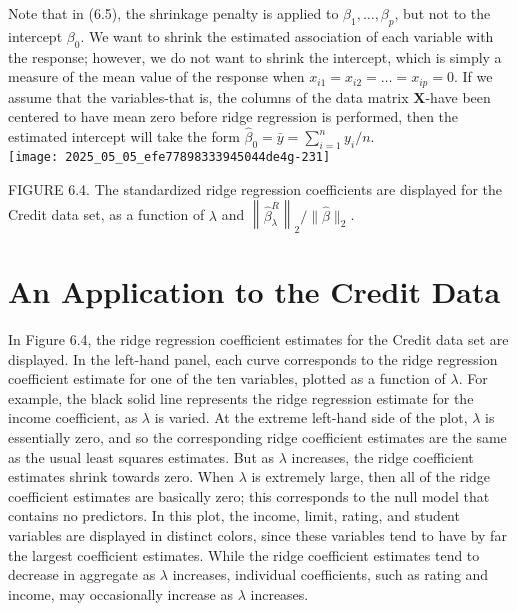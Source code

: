 \documentclass[10pt]{article}
\begin{document}

Note that in (6.5), the shrinkage penalty is applied to $\beta_{1}, \ldots, \beta_{p}$, but not to the intercept $\beta_{0}$. We want to shrink the estimated association of each variable with the response; however, we do not want to shrink the intercept, which is simply a measure of the mean value of the response when $x_{i 1}=x_{i 2}=\ldots=x_{i p}=0$. If we assume that the variables-that is, the columns of the data matrix $\mathbf{X}$-have been centered to have mean zero before ridge regression is performed, then the estimated intercept will take the form $\hat{\beta}_{0}=\bar{y}=\sum_{i=1}^{n} y_{i} / n$.\\
\texttt{[image: 2025\_05\_05\_efe77898333945044de4g-231]}

FIGURE 6.4. The standardized ridge regression coefficients are displayed for the Credit data set, as a function of $\lambda$ and $\left\|\hat{\beta}_{\lambda}^{R}\right\|_{2} /\|\hat{\beta}\|_{2}$.

\section*{An Application to the Credit Data}
In Figure 6.4, the ridge regression coefficient estimates for the Credit data set are displayed. In the left-hand panel, each curve corresponds to the ridge regression coefficient estimate for one of the ten variables, plotted as a function of $\lambda$. For example, the black solid line represents the ridge regression estimate for the income coefficient, as $\lambda$ is varied. At the extreme left-hand side of the plot, $\lambda$ is essentially zero, and so the corresponding ridge coefficient estimates are the same as the usual least squares estimates. But as $\lambda$ increases, the ridge coefficient estimates shrink towards zero. When $\lambda$ is extremely large, then all of the ridge coefficient estimates are basically zero; this corresponds to the null model that contains no predictors. In this plot, the income, limit, rating, and student variables are displayed in distinct colors, since these variables tend to have by far the largest coefficient estimates. While the ridge coefficient estimates tend to decrease in aggregate as $\lambda$ increases, individual coefficients, such as rating and income, may occasionally increase as $\lambda$ increases.
\end{document}
